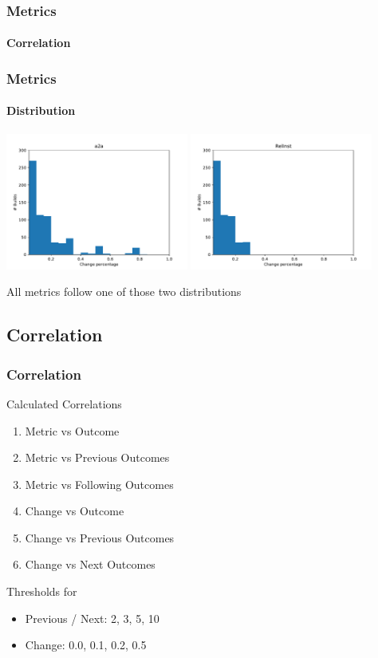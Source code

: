\documentclass{beamer}
\begin{document}
\begin{frame}
	\frametitle{Metrics}
	\framesubtitle{Correlation}
	
	
\end{frame}

\begin{frame}
	\frametitle{Metrics}
	\framesubtitle{Distribution}
	
	\includegraphics[width=6cm]{assets/A2A.pdf}
	\includegraphics[width=6cm]{assets/RelInst.pdf}
	
	\begin{block}{}
		All metrics follow one of those two distributions
	\end{block}
	
\end{frame}

\subsection{Correlation}
\begin{frame}
	\frametitle{Correlation}
	
	Calculated Correlations
	\begin{enumerate}
		\item Metric vs Outcome
		\item Metric vs Previous Outcomes
		\item Metric vs Following Outcomes
		\item Change vs Outcome
		\item Change vs Previous Outcomes
		\item Change vs Next Outcomes
	\end{enumerate}
	
	Thresholds for
	\begin{itemize}
		\item Previous / Next: 2, 3, 5, 10
		\item Change: 0.0, 0.1, 0.2, 0.5
	\end{itemize}
	
\end{frame}
\end{document}
